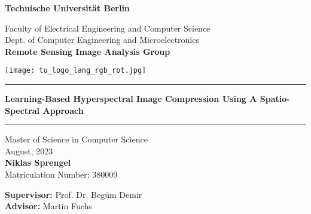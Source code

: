 \thispagestyle{empty}
\begin{center}

{\LARGE \textbf{Technische Universit{\"a}t Berlin}}

\vspace{0.6cm}

{\large Faculty of Electrical Engineering and Computer Science\\[1mm]}
{\large Dept. of Computer Engineering and Microelectronics\\[1mm]}
{\large \textbf{Remote Sensing Image Analysis Group}\\[5mm]}

\vspace*{0.5cm}

\texttt{[image: tu\_logo\_lang\_rgb\_rot.jpg]} %

\vspace{0.2cm}
\begin{center}
\rule{0.85\textwidth}{.4pt}
\end{center}
\vspace{0.2cm}
{\LARGE \textbf{Learning-Based Hyperspectral Image Compression Using A Spatio-Spectral Approach}} %
\begin{center}
\rule{0.85\textwidth}{.4pt}
\end{center}
\vspace{0.5cm}
{\LARGE Master of Science in Computer Science}\\
\vspace*{0.2cm}
{\large August, 2023}\\ %
\vspace*{0.5cm}
{\LARGE \textbf{Niklas Sprengel}}
\\
\vspace*{0.5cm}
{\large Matriculation Number: 380009} \\
\vspace*{0.5cm}
\begin{flushleft}
\hspace*{1.2cm}
{\large \textbf{Supervisor:}} \hspace*{0.5cm} {\large Prof. Dr. Beg{\"u}m Demir}\\
\vspace*{0.5cm}
\hspace*{1.2cm}
{\large \textbf{Advisor:}} \hspace*{1.15cm} {\large Martin Fuchs}
\vspace{2cm}
\end{flushleft}

\end{center}



